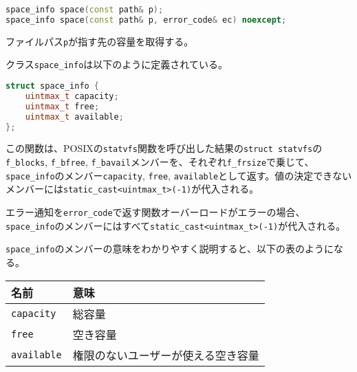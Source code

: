 \bgroup
\begin{lstlisting}[language=C++]
space_info space(const path& p);
space_info space(const path& p, error_code& ec) noexcept;
\end{lstlisting}
\egroup

ファイルパス\lstinline!p!が指す先の容量を取得する。

クラス\lstinline!space_info!は以下のように定義されている。

\begin{lstlisting}[language=C++]
struct space_info {
    uintmax_t capacity;
    uintmax_t free;
    uintmax_t available;
};
\end{lstlisting}

この関数は、POSIXの\lstinline!statvfs!関数を呼び出した結果の\lstinline!struct statvfs!の\lstinline!f_blocks!,
\lstinline!f_bfree!,
\lstinline!f_bavail!メンバーを、それぞれ\lstinline!f_frsize!で乗じて、\lstinline!space_info!のメンバー\lstinline!capacity!,
\lstinline!free!,
\lstinline!available!として返す。値の決定できないメンバーには\lstinline!static_cast<uintmax_t>(-1)!が代入される。

エラー通知を\lstinline!error_code!で返す関数オーバーロードがエラーの場合、\lstinline!space_info!のメンバーにはすべて\lstinline!static_cast<uintmax_t>(-1)!が代入される。

\lstinline!space_info!のメンバーの意味をわかりやすく説明すると、以下の表のようになる。

\small
\begin{longtable}[l]{@{\ \ }p{}p{}@{\ \ }}
\toprule
名前 & 意味\tabularnewline
\midrule
\endhead
\lstinline!capacity! & 総容量\tabularnewline
\lstinline!free! & 空き容量\tabularnewline
\lstinline!available! &
権限のないユーザーが使える空き容量\tabularnewline
\bottomrule
\end{longtable}
\normalsize
